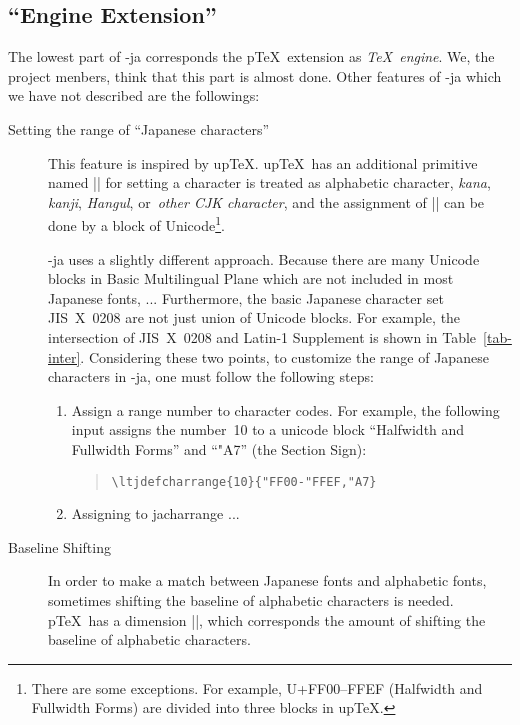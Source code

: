 \documentclass{ajt}
\begin{document}
\subsection{``Engine Extension''}
The lowest part of \LuaTeX-ja corresponds the p\TeX\ extension as
\emph{\TeX\ engine}. We, the project menbers, think that this part is almost
done. Other features of \LuaTeX-ja which we have not described are the
followings:
\begin{description}
\item[Setting the range of ``Japanese characters''] This feature is
	   inspired by up\TeX. up\TeX\ has an additional primitive named
	   |\kcatcode| for setting a character is treated as alphabetic
	   character, \emph{kana}, \emph{kanji}, \emph{Hangul},
	   or~\emph{other CJK character}, and the assignment of
	   |\kcatcode| can be done by a block of Unicode\footnote{There
	   are some exceptions. For example, U+FF00--FFEF (Halfwidth and
	   Fullwidth Forms) are divided into three blocks in up\TeX.}.

\LuaTeX-ja uses a slightly different approach. Because there are many
	   Unicode blocks in Basic Multilingual Plane which are not
	   included in most Japanese fonts, ...  Furthermore, the basic
	   Japanese character set JIS~X~0208 are not just union of
	   Unicode blocks. For example, the intersection of JIS~X~0208
	   and Latin-1 Supplement is shown in Table~\ref{tab-inter}.
	   Considering these two points, to customize the range of
	   Japanese characters in \LuaTeX-ja, one must follow the
	   following steps:
\begin{enumerate}
\item Assign a range number to character codes. For example, the following
      input assigns the number~10 to a unicode block ``Halfwidth and
      Fullwidth Forms'' and ``\char"A7'' (the Section Sign):
\begin{quote}
\begin{verbatim}
\ltjdefcharrange{10}{"FF00-"FFEF,"A7}
\end{verbatim}
\end{quote}
\item Assigning to \textsf{jacharrange} ...
\end{enumerate}

\item[Baseline Shifting]
In order to make a match between Japanese fonts and alphabetic fonts,
	   sometimes shifting the baseline of alphabetic characters is
	   needed. p\TeX\ has a dimension |\ybaselineshift|, which
	   corresponds the amount of shifting the baseline of alphabetic
	   characters. 


\end{description}
\end{document}

